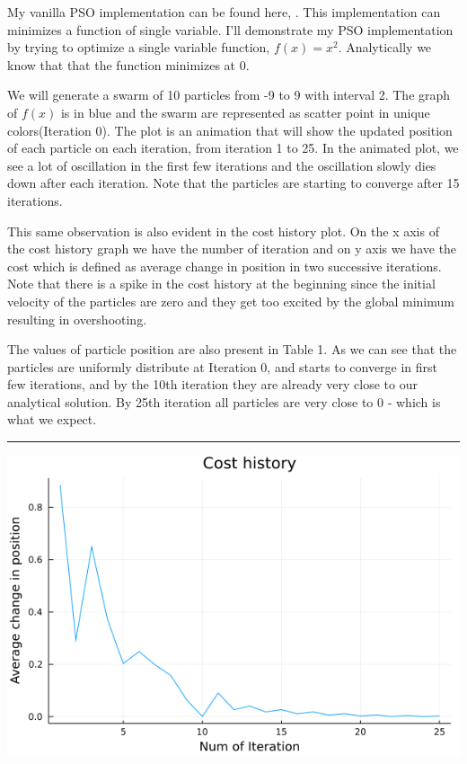 \documentclass{article}
\begin{document}
My vanilla PSO implementation can be found here, \cite{irfan_2021VJ}. This implementation can minimizes a function of single variable. I'll demonstrate my PSO implementation by trying to optimize a single variable function, $f(x) = x^2$. Analytically we know that that the function minimizes at 0.

We will generate a swarm of 10 particles from -9 to 9 with interval 2. The graph of $f(x)$ is in blue and the swarm are represented as scatter point in unique colors(Iteration 0). The plot is an animation that will show the updated position of each particle on each iteration, from iteration 1 to 25. In the animated plot, we see a lot of oscillation in the first few iterations and the oscillation slowly dies down after each iteration. Note that the particles are starting to converge after 15 iterations.  

This same observation is also evident in the cost history plot. On the x axis of the cost history graph we have the number of iteration and on y axis we have the cost which is defined as average change in position in two successive iterations. Note that there is a spike in the cost history at the beginning since the initial velocity of the particles are zero and they get too excited by the global minimum resulting in overshooting.

The values of particle position are also present in Table 1. As we can see that the particles are uniformly distribute at Iteration 0, and starts to converge in first few iterations, and by the 10th iteration they are already very close to our analytical solution. By 25th iteration all particles are very close to 0 - which is what we expect.

\begin{center}
\end{center}
\begin{center}
\noindent\rule{12cm}{0.1pt}
\includegraphics[width=\linewidth]{./plots/CostHistory.png}
\end{center}
\end{document}

